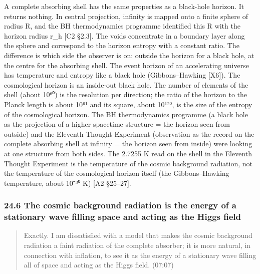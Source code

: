 \documentclass[
  a4paper,
]{article}
\begin{document}
A complete absorbing shell has the same properties as a black-hole
horizon. It returns nothing. In central projection, infinity is mapped
onto a finite sphere of radius R, and the BH thermodynamics programme
identified this R with the horizon radius r\_h {[}C2 §2.3{]}. The voids
concentrate in a boundary layer along the sphere and correspond to the
horizon entropy with a constant ratio. The difference is which side the
observer is on: outside the horizon for a black hole, at the centre for
the absorbing shell. The event horizon of an accelerating universe has
temperature and entropy like a black hole (Gibbons--Hawking {[}X6{]}).
The cosmological horizon is an inside-out black hole. The number of
elements of the shell (about 10⁶⁰) is the resolution per direction; the
ratio of the horizon to the Planck length is about 10⁶¹ and its square,
about 10¹²², is the size of the entropy of the cosmological horizon. The
BH thermodynamics programme (a black hole as the projection of a higher
spacetime structure = the horizon seen from outside) and the Eleventh
Thought Experiment (observation as the record on the complete absorbing
shell at infinity = the horizon seen from inside) were looking at one
structure from both sides. The 2.7255 K read on the shell in the
Eleventh Thought Experiment is the temperature of the cosmic background
radiation, not the temperature of the cosmological horizon itself (the
Gibbons--Hawking temperature, about 10⁻³⁰ K) {[}A2 §25--27{]}.

\subsubsection{24.6 The cosmic background radiation is the energy of a
stationary wave filling space and acting as the Higgs
field}\label{the-cosmic-background-radiation-is-the-energy-of-a-stationary-wave-filling-space-and-acting-as-the-higgs-field}

\begin{quote}
Exactly. I am dissatisfied with a model that makes the cosmic background
radiation a faint radiation of the complete absorber; it is more
natural, in connection with inflation, to see it as the energy of a
stationary wave filling all of space and acting as the Higgs field.
(07:07)
\end{quote}
\end{document}
